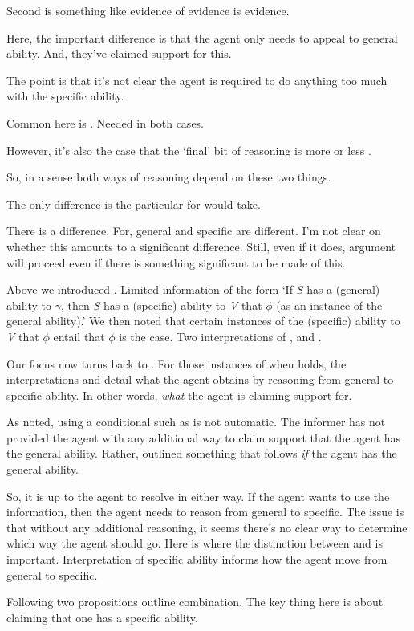 \begin{note}
  Second is something like evidence of evidence is evidence.

  Here, the important difference is that the agent only needs to appeal to general ability.
  And, they've claimed support for this.

  The point is that it's not clear the agent is required to do anything too much with the specific ability.
\end{note}

\begin{note}[Focus]
  Common here is \gsi{}.
  Needed in both cases.

  However, it's also the case that the `final' bit of reasoning is more or less .

  So, in a sense both ways of reasoning depend on these two things.

  The only difference is the particular for  would take.

  There is a difference.
  For, general and specific are different.
  I'm not clear on whether this amounts to a significant difference.
  Still, even if it does, argument will proceed even if there is something significant to be made of this.
\end{note}

\begin{note}[Summarising]
  Above we introduced \gsi{}.
  Limited information of the form `If \emph{S} has a (general) ability to \(\gamma\), then \emph{S} has a (specific) ability to \emph{V} that \(\phi\) (as an instance of the general ability).'
  We then noted that certain instances of the (specific) ability to \emph{V} that \(\phi\) entail that \(\phi\) is the case.
  Two interpretations of , \AR{} and \WR{}.

  Our focus now turns back to \gsi{}.
  For those instances of \gsi{} when  holds, the interpretations \AR{} and \WR{} detail what the agent obtains by reasoning from general to specific ability.
  In other words, \emph{what} the agent is claiming support for.

  As noted, using a conditional such as \gsi{} is not automatic.
  The informer has not provided the agent with any additional way to claim support that the agent has the general ability.
  Rather, outlined something that follows \emph{if} the agent has the general ability.

  So, it is up to the agent to resolve in either way.
  If the agent wants to use the information, then the agent needs to reason from general to specific.
  The issue is that without any additional reasoning, it seems there's no clear way to determine which way the agent should go.
  Here is where the distinction between \AR{} and \WR{} is important.
  Interpretation of specific ability informs how the agent move from general to specific.

  Following two propositions outline combination.
  {
    \color{red}
    The key thing here is about claiming that one has a specific ability.
  }
\end{note}

